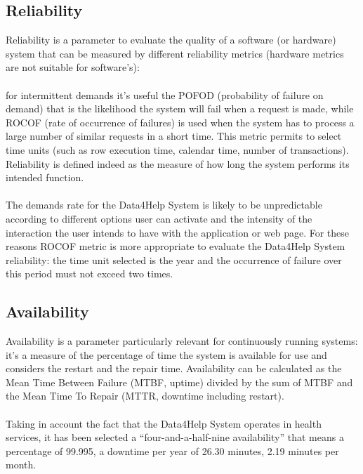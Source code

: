 \subsection{Reliability}
Reliability is a parameter to evaluate the quality of a software (or hardware) system that can be measured by different reliability metrics (hardware metrics are not suitable for software’s):
\\ 
\\
for intermittent demands it’s useful the POFOD (probability of failure on demand) that is the likelihood the system will fail when a request is made, while ROCOF (rate of occurrence of failures) is used when the system has to process a large number of similar requests in a short time. This metric permits to select time units (such as row execution time, calendar time, number of transactions). Reliability is defined indeed as the measure of how long the system performs its intended function. 
\\
\\
The demands rate for the Data4Help System is likely to be unpredictable according to different options user can activate and the intensity of the interaction the user intends to have with the application or web page. For these reasons ROCOF metric is more appropriate to evaluate the Data4Help System reliability: the time unit selected is the year and the occurrence of failure over this period must not exceed two times. 

\subsection{Availability}
Availability is a parameter particularly relevant for continuously running systems: it’s a measure of the percentage of time the system is available for use and considers the restart and the repair time. Availability can be calculated as the Mean Time Between Failure (MTBF, uptime) divided by the sum of MTBF and the Mean Time To Repair (MTTR, downtime including restart).
\\
\\ 
Taking in account the fact that the Data4Help System operates in health services, it has been selected a “four-and-a-half-nine availability” that means a percentage of 99.995, a downtime per year of 26.30 minutes, 2.19 minutes per month.  
